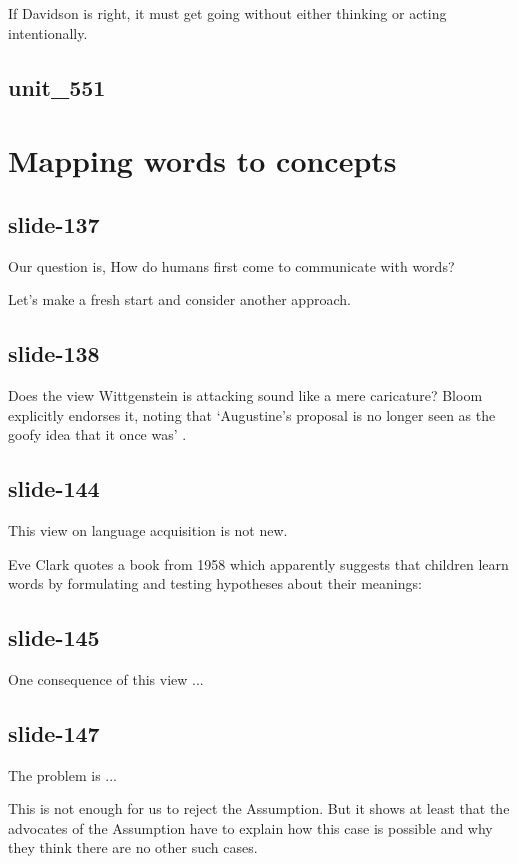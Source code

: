 \documentclass[12pt,\papersize]{extarticle}
\begin{document}
If Davidson is right, it must get going without either thinking or acting intentionally.
 
\subsection{unit\_551}
 
 
\section{Mapping words to concepts}
 
\subsection{slide-137}
Our question is, How do humans first come to communicate with words?
 
Let's make a fresh start and consider another approach.
 
\subsection{slide-138}
Does the view Wittgenstein is attacking sound like a mere caricature?  Bloom explicitly endorses it, noting that
‘Augustine’s proposal is no longer seen as the goofy idea that it once was’ \citep[p.\ 61]{Bloom:2000qz}.
 
\subsection{slide-144}
This view on language acquisition is not new.
 
Eve Clark quotes a book from 1958 which apparently suggests that children learn words by formulating and testing hypotheses about their meanings:
 
\subsection{slide-145}
One consequence of this view ...
 
\subsection{slide-147}
The problem is ...
 
This is not enough for us to reject the Assumption.  But it shows at least that the advocates of the Assumption have to explain how this case is possible and why they think there are no other such cases.
 
\end{document}
